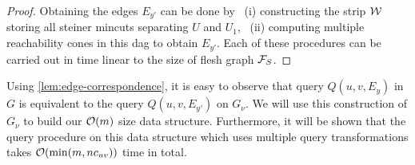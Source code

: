 \begin{proof}

Obtaining the edges $E_{y'}$ can be done by
~(i) constructing the strip ${\cal W}$ storing all steiner mincuts separating $U$ and $U_1$,
~(ii) computing multiple reachability cones in this dag to obtain $E_{y'}$. Each of these procedures can be carried out in time linear to the size of flesh graph ${\cal F}_S$.
\end{proof}



Using \ref{lem:edge-correspondence}, it is easy to observe that query $Q(u,v,E_y)$ in $G$ is equivalent to the query $Q(u,v,E_{y'})$ on $G_\nu$. We will use this construction of $G_\nu$ to build our ${\cal O}(m)$ size data structure. Furthermore, it will be shown that the query procedure on this data structure which uses multiple query transformations takes ${\cal O}(\min(m,nc_{uv}))$ time in total.